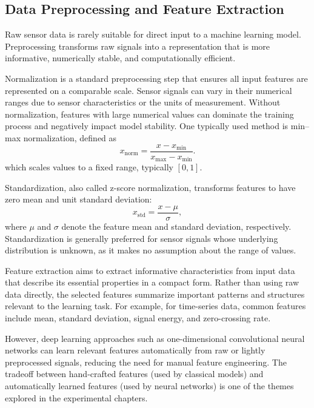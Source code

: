 \subsection{Data Preprocessing and Feature Extraction}
Raw sensor data is rarely suitable for direct input to a machine learning model. Preprocessing transforms raw signals into a representation that is more informative, numerically stable, and computationally efficient.

Normalization is a standard preprocessing step that ensures all input features are represented on a comparable scale. Sensor signals can vary in their numerical ranges due to sensor characteristics or the units of measurement. Without normalization, features with large numerical values can dominate the training process and negatively impact model stability. One typically used method is min--max normalization, defined as
\begin{equation}
  x_{\text{norm}} = \frac{x - x_{\min}}{x_{\max} - x_{\min}}.
\end{equation}
which scales values to a fixed range, typically $[0,1]$.

Standardization, also called z-score normalization, transforms features to have zero mean and unit standard deviation:
\begin{equation}
  x_{\text{std}} = \frac{x - \mu}{\sigma},
\end{equation}
where $\mu$ and $\sigma$ denote the feature mean and standard deviation, respectively. Standardization is generally preferred for sensor signals whose underlying distribution is unknown, as it makes no assumption about the range of values. 

Feature extraction aims to extract informative characteristics from input data that describe its essential properties in a compact form. Rather than using raw data directly, the selected features summarize important patterns and structures relevant to the learning task. For example, for time-series data, common features include mean, standard deviation, signal energy, and zero-crossing rate.

However, deep learning approaches such as one-dimensional convolutional neural networks can learn relevant features automatically from raw or lightly preprocessed signals, reducing the need for manual feature engineering. The tradeoff between hand-crafted features (used by classical models) and automatically learned features (used by neural networks) is one of the themes explored in the experimental chapters.

